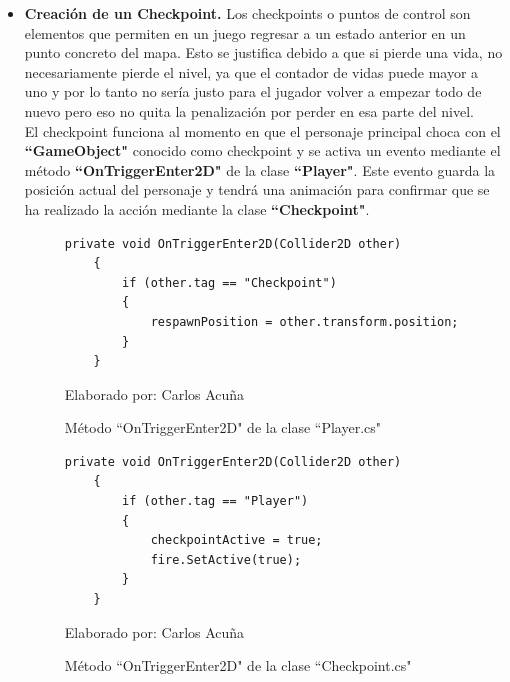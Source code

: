 \documentclass[a4paper, openright, 12pt]{report}
\begin{document}
\begin{itemize}

\item \textbf{Creación de un Checkpoint.} Los checkpoints o puntos de control son elementos que permiten en un juego regresar a un estado anterior en un punto concreto del mapa. Esto se justifica debido a que si pierde una vida, no necesariamente pierde el nivel, ya que el contador de vidas puede mayor a uno y por lo tanto no sería justo para el jugador volver a empezar todo de nuevo pero eso no quita la penalización por perder en esa parte del nivel.\\
El checkpoint funciona al momento en que el personaje principal choca con el \textbf{``GameObject"} conocido como checkpoint y se activa un evento mediante el método \textbf{``OnTriggerEnter2D"} de la clase \textbf{``Player"}. Este evento guarda la posición actual del personaje y tendrá una animación para confirmar que se ha realizado la acción mediante la clase \textbf{``Checkpoint"}.

\begin{figure}[h]
\captionsetup{justification=centering,margin=2cm}
\centering
\lstset{language=C, breaklines=true, basicstyle=\footnotesize}
\lstset{numbers=left, numberstyle=\tiny, stepnumber=1, numbersep=-2pt}
\captionsetup{justification=centering,margin=2cm}
\begin{lstlisting}[frame=single]
  private void OnTriggerEnter2D(Collider2D other)
    {
        if (other.tag == "Checkpoint")
        {
            respawnPosition = other.transform.position;
        }
    }
\end{lstlisting}
\caption{Método ``OnTriggerEnter2D" de la clase ``Player.cs"}
Elaborado por: Carlos Acuña
\end{figure}

\begin{figure}[h]
\captionsetup{justification=centering,margin=2cm}
\centering
\lstset{language=C, breaklines=true, basicstyle=\footnotesize}
\lstset{numbers=left, numberstyle=\tiny, stepnumber=1, numbersep=-2pt}
\captionsetup{justification=centering,margin=2cm}
\begin{lstlisting}[frame=single]
  private void OnTriggerEnter2D(Collider2D other)
    {
        if (other.tag == "Player")
        {
            checkpointActive = true;
            fire.SetActive(true);
        }
    }
\end{lstlisting}
\caption{Método ``OnTriggerEnter2D" de la clase ``Checkpoint.cs"}
Elaborado por: Carlos Acuña
\end{figure}


\end{itemize}
\end{document}
